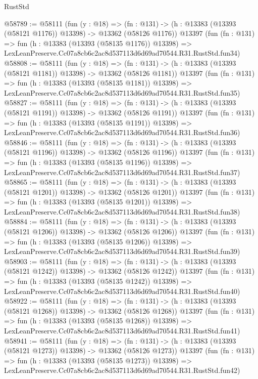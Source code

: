 \begin{lexlean}{RustStd}
\begin{coremodule}
@58789 := @58111
    (fun (y : @18) =>
    (fn : @131) -> (h : @13383 (@13393 (@58121 @1176)) @13398) -> @13362 (@58126 @1176))
    @13397
    (fun (fn : @131) =>
    fun (h : @13383 (@13393 (@58135 @1176)) @13398) =>
    LexLeanPreserve.Cc07a8cb6c2ac8d537113d6d69ad70544.R31.RustStd.fun34)
@58808 := @58111
    (fun (y : @18) =>
    (fn : @131) -> (h : @13383 (@13393 (@58121 @1181)) @13398) -> @13362 (@58126 @1181))
    @13397
    (fun (fn : @131) =>
    fun (h : @13383 (@13393 (@58135 @1181)) @13398) =>
    LexLeanPreserve.Cc07a8cb6c2ac8d537113d6d69ad70544.R31.RustStd.fun35)
@58827 := @58111
    (fun (y : @18) =>
    (fn : @131) -> (h : @13383 (@13393 (@58121 @1191)) @13398) -> @13362 (@58126 @1191))
    @13397
    (fun (fn : @131) =>
    fun (h : @13383 (@13393 (@58135 @1191)) @13398) =>
    LexLeanPreserve.Cc07a8cb6c2ac8d537113d6d69ad70544.R31.RustStd.fun36)
@58846 := @58111
    (fun (y : @18) =>
    (fn : @131) -> (h : @13383 (@13393 (@58121 @1196)) @13398) -> @13362 (@58126 @1196))
    @13397
    (fun (fn : @131) =>
    fun (h : @13383 (@13393 (@58135 @1196)) @13398) =>
    LexLeanPreserve.Cc07a8cb6c2ac8d537113d6d69ad70544.R31.RustStd.fun37)
@58865 := @58111
    (fun (y : @18) =>
    (fn : @131) -> (h : @13383 (@13393 (@58121 @1201)) @13398) -> @13362 (@58126 @1201))
    @13397
    (fun (fn : @131) =>
    fun (h : @13383 (@13393 (@58135 @1201)) @13398) =>
    LexLeanPreserve.Cc07a8cb6c2ac8d537113d6d69ad70544.R31.RustStd.fun38)
@58884 := @58111
    (fun (y : @18) =>
    (fn : @131) -> (h : @13383 (@13393 (@58121 @1206)) @13398) -> @13362 (@58126 @1206))
    @13397
    (fun (fn : @131) =>
    fun (h : @13383 (@13393 (@58135 @1206)) @13398) =>
    LexLeanPreserve.Cc07a8cb6c2ac8d537113d6d69ad70544.R31.RustStd.fun39)
@58903 := @58111
    (fun (y : @18) =>
    (fn : @131) -> (h : @13383 (@13393 (@58121 @1242)) @13398) -> @13362 (@58126 @1242))
    @13397
    (fun (fn : @131) =>
    fun (h : @13383 (@13393 (@58135 @1242)) @13398) =>
    LexLeanPreserve.Cc07a8cb6c2ac8d537113d6d69ad70544.R31.RustStd.fun40)
@58922 := @58111
    (fun (y : @18) =>
    (fn : @131) -> (h : @13383 (@13393 (@58121 @1268)) @13398) -> @13362 (@58126 @1268))
    @13397
    (fun (fn : @131) =>
    fun (h : @13383 (@13393 (@58135 @1268)) @13398) =>
    LexLeanPreserve.Cc07a8cb6c2ac8d537113d6d69ad70544.R31.RustStd.fun41)
@58941 := @58111
    (fun (y : @18) =>
    (fn : @131) -> (h : @13383 (@13393 (@58121 @1273)) @13398) -> @13362 (@58126 @1273))
    @13397
    (fun (fn : @131) =>
    fun (h : @13383 (@13393 (@58135 @1273)) @13398) =>
    LexLeanPreserve.Cc07a8cb6c2ac8d537113d6d69ad70544.R31.RustStd.fun42)

\end{coremodule}
\end{lexlean}
